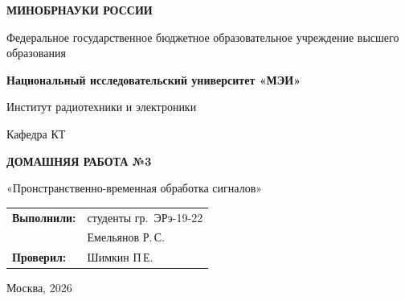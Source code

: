 \begin{titlepage}
    \centering
    {\bfseries МИНОБРНАУКИ РОССИИ\par}
    Федеральное государственное бюджетное образовательное учреждение высшего образования \\
    {\bfseries Национальный исследовательский университет «МЭИ»\par}
    \vspace{1cm}
    Институт радиотехники и электроники\par
    Кафедра КТ\par
    \vspace{3cm}
    
    {\bfseries\large ДОМАШНЯЯ РАБОТА №3\par}
    \vspace{0.5cm}
    {\large «Пронстранственно-временная обработка сигналов»\par}
    
    \vspace{3.5cm}
 \vspace{1.5cm}
\noindent\hfill
\begin{tabular}{@{}ll@{}}
    \textbf{Выполнили:} & студенты гр.~ЭРэ-19-22 \\
                        & Емельянов Р.\,С. \\
    \textbf{Проверил:}  & Шимкин П\,Е.
\end{tabular}   
    \vfill
    {Москва, 2026}
\end{titlepage}
